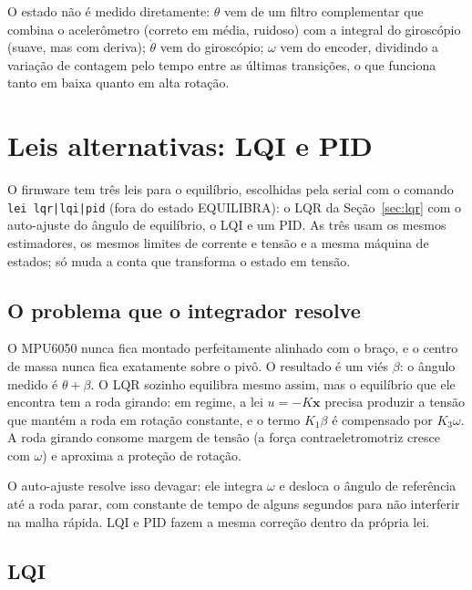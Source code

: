 \documentclass[11pt,a4paper]{article}
\newcommand{\vt}[1]{\bm{#1}}
\begin{document}
O estado não é medido diretamente: $\theta$ vem de um filtro complementar que combina o
acelerômetro (correto em média, ruidoso) com a integral do giroscópio (suave, mas com deriva);
$\dot\theta$ vem do giroscópio; $\omega$ vem do encoder, dividindo a variação de contagem pelo
tempo entre as últimas transições, o que funciona tanto em baixa quanto em alta rotação.

\section{Leis alternativas: LQI e PID}
\label{sec:leis}

O firmware tem três leis para o equilíbrio, escolhidas pela serial com o comando
\texttt{lei lqr|lqi|pid} (fora do estado EQUILIBRA): o LQR da Seção~\ref{sec:lqr} com o
auto-ajuste do ângulo de equilíbrio, o LQI e um PID. As três usam os mesmos estimadores, os
mesmos limites de corrente e tensão e a mesma máquina de estados; só muda a conta que transforma
o estado em tensão.

\subsection{O problema que o integrador resolve}

O MPU6050 nunca fica montado perfeitamente alinhado com o braço, e o centro de massa nunca fica
exatamente sobre o pivô. O resultado é um viés $\beta$: o ângulo medido é $\theta + \beta$. O
LQR sozinho equilibra mesmo assim, mas o equilíbrio que ele encontra tem a roda girando: em
regime, a lei $u = -K\vt{x}$ precisa produzir a tensão que mantém a roda em rotação constante,
e o termo $K_1\beta$ é compensado por $K_3\omega$. A roda girando consome margem de tensão (a
força contraeletromotriz cresce com $\omega$) e aproxima a proteção de rotação.

O auto-ajuste resolve isso devagar: ele integra $\omega$ e desloca o ângulo de referência até a
roda parar, com constante de tempo de alguns segundos para não interferir na malha rápida. LQI e
PID fazem a mesma correção dentro da própria lei.

\subsection{LQI}
\end{document}
